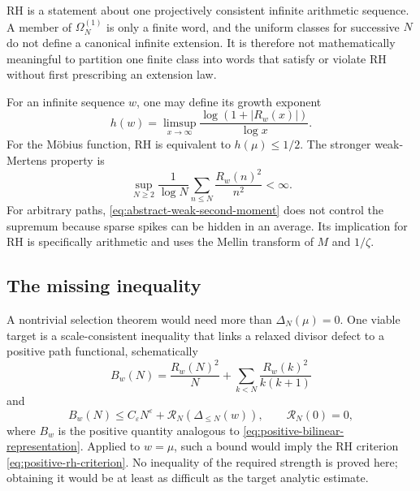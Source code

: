 \documentclass[11pt,reqno]{amsart}
\numberwithin{equation}{section}
\theoremstyle{plain}
\theoremstyle{definition}
\theoremstyle{remark}
\newcommand{\Om}{\Omega}
\newcommand{\eps}{\varepsilon}
\begin{document}
RH is a statement about one projectively consistent infinite arithmetic
sequence.  A member of \(\Om_N^{(1)}\) is only a finite word, and the uniform
classes for successive \(N\) do not define a canonical infinite extension.
It is therefore not mathematically meaningful to partition one finite class
into words that satisfy or violate RH without first prescribing an extension
law.

For an infinite sequence \(w\), one may define its growth exponent
\begin{equation}
h(w)=\limsup_{x\to\infty}
\frac{\log(1+|R_w(x)|)}{\log x}.
\label{eq:path-growth-exponent}
\end{equation}
For the M\"obius function, RH is equivalent to \(h(\mu)\leq1/2\).  The
stronger weak-Mertens property is
\begin{equation}
\sup_{N\geq2}\frac1{\log N}
\sum_{n\leq N}\frac{R_w(n)^2}{n^2}<\infty.
\label{eq:abstract-weak-second-moment}
\end{equation}
For arbitrary paths, \eqref{eq:abstract-weak-second-moment} does not control
the supremum because sparse spikes can be hidden in an average.  Its
implication for RH is specifically arithmetic and uses the Mellin transform
of \(M\) and \(1/\zeta\).

\subsection{The missing inequality}
\label{subsec:missing-coercive-inequality}

A nontrivial selection theorem would need more than
\(\Delta_N(\mu)=0\).  One viable target is a scale-consistent inequality that
links a relaxed divisor defect to a positive path functional, schematically
\begin{equation}
B_w(N)=\frac{R_w(N)^2}{N}
+\sum_{k<N}\frac{R_w(k)^2}{k(k+1)}
\label{eq:general-positive-path-functional}
\end{equation}
and
\begin{equation}
B_w(N)
\leq C_{\eps}N^{\eps}
+\mathcal R_N\!\left(\Delta_{\leq N}(w)\right),
\qquad
\mathcal R_N(0)=0,
\label{eq:desired-coercive-inequality}
\end{equation}
where \(B_w\) is the positive quantity analogous to
\eqref{eq:positive-bilinear-representation}.  Applied to \(w=\mu\), such a
bound would imply the RH criterion \eqref{eq:positive-rh-criterion}.  No
inequality of the required strength is proved here; obtaining it would be at
least as difficult as the target analytic estimate.
\end{document}
